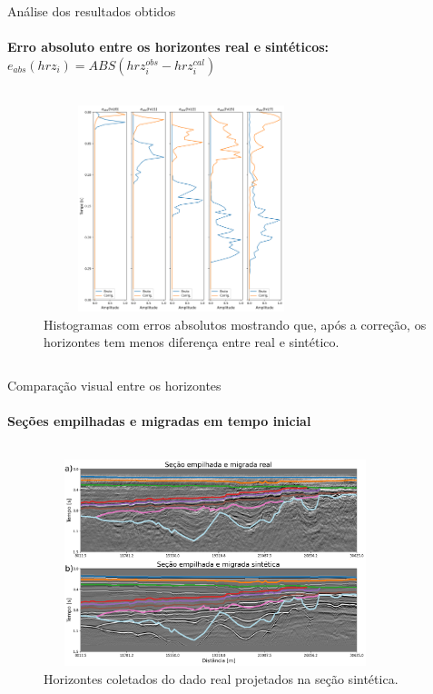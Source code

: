 \documentclass[xcolor=dvipsnames,t]{beamer}
\begin{document}
\begin{frame}{Análise dos resultados obtidos}
\framesubtitle{Erro absoluto entre os horizontes real e sintéticos: $e_{abs}(hrz_i) = ABS(hrz_i^{obs} - hrz_i^{cal})$}	
	
\begin{columns}[onlytextwidth, T]
	\begin{column}{.9\textwidth}
		\begin{figure}[h]
			\includegraphics[width=8cm,height=6cm]{../imagens/analise.png}	
			\tiny{\caption{Histogramas com erros absolutos mostrando que, após a correção, os horizontes tem menos diferença entre real e sintético.}} 	
		\end{figure}			
	\end{column}
\end{columns}	
	
\end{frame}
\begin{frame}{Comparação visual entre os horizontes}
\framesubtitle{Seções empilhadas e migradas em tempo inicial}	

\begin{columns}[onlytextwidth, T]
	\begin{column}{.9\textwidth}
		\begin{figure}[h]
			\includegraphics[width=10cm,height=6cm]{../imagens/comparisionHRZ.png}	
			\tiny{\caption{Horizontes coletados do dado real projetados na seção sintética.}} 	
		\end{figure}			
	\end{column}
\end{columns}	

\end{frame}
\end{document}
